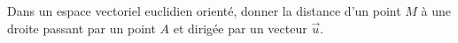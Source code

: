 Dans un espace vectoriel euclidien orient\'e, donner la distance d'un point $M$ \`a une droite passant par un point $A$ et dirig\'ee par un vecteur $\overrightarrow{u}$.

\bigskip
